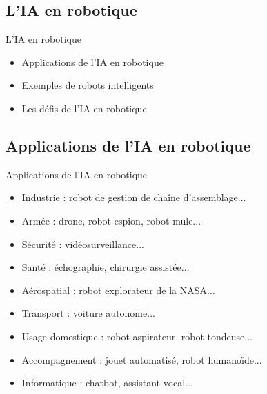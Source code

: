 \documentclass{beamer}
\begin{document}
{
\subsection{L'IA en robotique}
\begin{frame}{L'IA en robotique}
	\Large
	\begin{itemize}
		\item Applications de l'IA en robotique
		\item Exemples de robots intelligents
		\item Les défis de l'IA en robotique
	\end{itemize}
\end{frame}
}

\subsection{Applications de l'IA en robotique}
\begin{frame}{Applications de l'IA en robotique}
    \begin{itemize}
	\item Industrie : robot de gestion de chaîne d'assemblage...
	\item Armée : drone, robot-espion, robot-mule...
	\item Sécurité : vidéosurveillance...
	\item Santé : échographie, chirurgie assistée...
	\item Aérospatial : robot explorateur de la NASA...
	\item Transport : voiture autonome...
	\item Usage domestique : robot aspirateur, robot tondeuse...
	\item Accompagnement : jouet automatisé, robot humanoïde...
	\item Informatique : chatbot, assistant vocal...
\end{itemize}
\end{frame}
\end{document}
